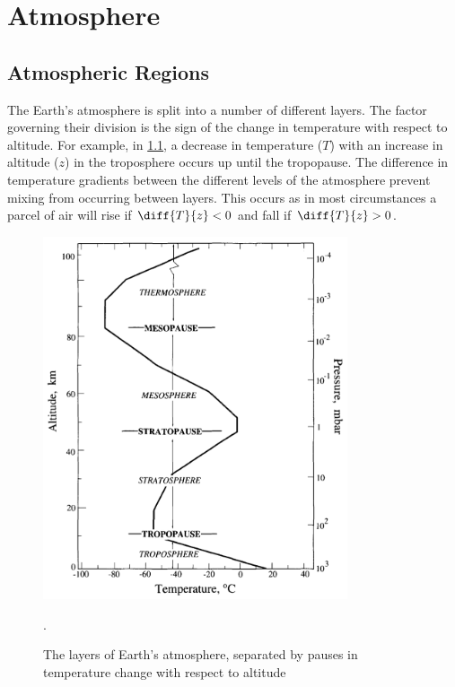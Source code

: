 





\chapter{Atmosphere}
\label{ch:atmo}

\section{Atmospheric Regions}
\label{sec:atmoreg}

The Earth's atmosphere is split into a number of different layers. The factor governing their division is the sign of the change in temperature with respect to altitude. For example, in \cref{fig:atmolay}, a decrease in temperature ($T$) with an increase in altitude ($z$) in the troposphere occurs up until the tropopause. The difference in temperature gradients between the different levels of the atmosphere prevent mixing from occurring between layers. This occurs as in most circumstances a parcel of air will rise if $\diff{T}{z} < 0$ and fall if $\diff{T}{z} > 0$.

	\begin{figure}[!htb]
	 	\centering
	 	\includegraphics[width=0.8\textwidth,natwidth=1004,natheight=1196]{Fig/Literature_Review/Atmosphere_Layers.png}
	 	\caption{The layers of Earth's atmosphere, separated by pauses in temperature change with respect to altitude \citep[p. 7]{seinfeld2012atmospheric}}.
	 	\label{fig:atmolay}
	\end{figure}

